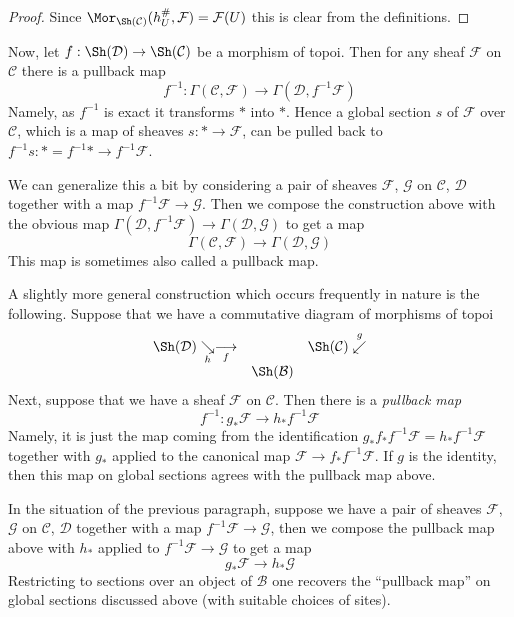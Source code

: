 \begin{proof}
Since $\Mor_{\Sh(\mathcal{C})}(h_U^\#, \mathcal{F}) = \mathcal{F}(U)$
this is clear from the definitions.
\end{proof}

Now, let $f : \Sh(\mathcal{D}) \to \Sh(\mathcal{C})$ be a morphism of topoi.
Then for any sheaf $\mathcal{F}$ on $\mathcal{C}$ there is a pullback map
$$
f^{-1} :
\Gamma(\mathcal{C}, \mathcal{F})
\longrightarrow
\Gamma(\mathcal{D}, f^{-1}\mathcal{F})
$$
Namely, as $f^{-1}$ is exact it transforms $*$ into $*$. Hence a global
section $s$ of $\mathcal{F}$ over $\mathcal{C}$, which is a map
of sheaves $s : * \to \mathcal{F}$, can be pulled back to
$f^{-1}s : * = f^{-1}* \to f^{-1}\mathcal{F}$.

\medskip\noindent
We can generalize this a bit by considering a pair of sheaves
$\mathcal{F}$, $\mathcal{G}$ on $\mathcal{C}$, $\mathcal{D}$
together with a map $f^{-1}\mathcal{F} \to \mathcal{G}$. Then we
compose the construction above with the obvious map
$\Gamma(\mathcal{D}, f^{-1}\mathcal{F}) \to \Gamma(\mathcal{D}, \mathcal{G})$
to get a map
$$
\Gamma(\mathcal{C}, \mathcal{F})
\longrightarrow
\Gamma(\mathcal{D}, \mathcal{G})
$$
This map is sometimes also called a pullback map.

\medskip\noindent
A slightly more general construction which occurs frequently in nature
is the following. Suppose that we have a commutative diagram of
morphisms of topoi
$$
\begin{array}{ccc}\Sh(\mathcal{D}) \underset{h}{\searrow}\underset{f}{\longrightarrow} &  & \Sh(\mathcal{C}) \overset{g}{\swarrow} \\  & \Sh(\mathcal{B}) & \end{array}
$$
Next, suppose that we have a sheaf $\mathcal{F}$ on $\mathcal{C}$.
Then there is a {\it pullback map}
$$
f^{-1} : g_*\mathcal{F} \longrightarrow h_*f^{-1}\mathcal{F}
$$
Namely, it is just the map coming from the identification
$g_*f_*f^{-1}\mathcal{F} = h_*f^{-1}\mathcal{F}$ together with
$g_*$ applied to the canonical map $\mathcal{F} \to f_*f^{-1}\mathcal{F}$.
If $g$ is the identity, then this map on global sections agrees
with the pullback map above.

\medskip\noindent
In the situation of the previous paragraph, suppose
we have a pair of sheaves $\mathcal{F}$, $\mathcal{G}$
on $\mathcal{C}$, $\mathcal{D}$ together with a map
$f^{-1}\mathcal{F} \to \mathcal{G}$, then we compose
the pullback map above with $h_*$ applied to
$f^{-1}\mathcal{F} \to \mathcal{G}$
to get a map
$$
g_*\mathcal{F} \longrightarrow h_*\mathcal{G}
$$
Restricting to sections over an object of $\mathcal{B}$ one recovers
the ``pullback map'' on global sections discussed above (with suitable
choices of sites).


